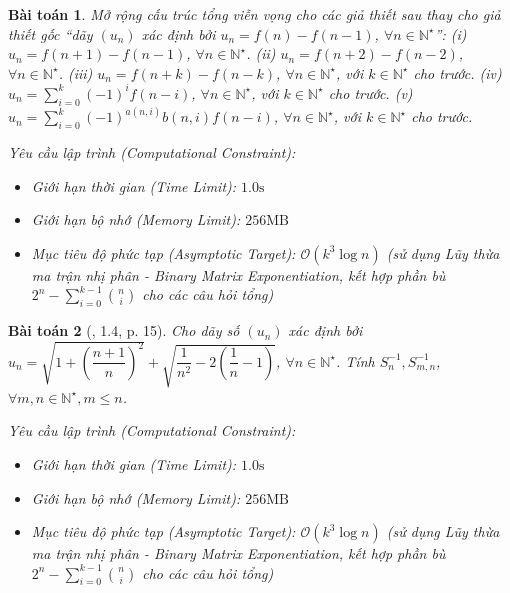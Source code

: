 \documentclass{article}
\newtheorem{baitoan}{Bài toán}
\begin{document}
\begin{baitoan}
	Mở rộng cấu trúc tổng viễn vọng cho các giả thiết sau thay cho giả thiết gốc ``dãy $(u_n)$ xác định bởi $u_n = f(n) - f(n - 1)$, $\forall n\in\mathbb{N}^\star$'': (i) $u_n = f(n+1) - f(n-1)$, $\forall n\in\mathbb{N}^\star$. (ii) $u_n = f(n+2) - f(n-2)$, $\forall n\in\mathbb{N}^\star$. (iii) $u_n = f(n+k) - f(n-k)$, $\forall n\in\mathbb{N}^\star$, với $k\in\mathbb{N}^\star$ cho trước. (iv) $u_n = \sum_{i=0}^k (-1)^i f(n-i)$, $\forall n\in\mathbb{N}^\star$, với $k\in\mathbb{N}^\star$ cho trước. (v) $u_n = \sum_{i=0}^k (-1)^{a(n,i)}b(n,i)f(n-i)$, $\forall n\in\mathbb{N}^\star$, với $k\in\mathbb{N}^\star$ cho trước.

    \vspace{0.5em}
    \emph{Yêu cầu lập trình (Computational Constraint):}
    \begin{itemize}
        \item Giới hạn thời gian (Time Limit): $1.0\mathrm{s}$
        \item Giới hạn bộ nhớ (Memory Limit): $256\mathrm{MB}$
        \item Mục tiêu độ phức tạp (Asymptotic Target): $\mathcal{O}(k^3 \log n)$ (sử dụng Lũy thừa ma trận nhị phân - Binary Matrix Exponentiation, kết hợp phần bù $2^n - \sum_{i=0}^{k-1} \binom{n}{i}$ cho các câu hỏi tổng)
    \end{itemize}
\end{baitoan}


\begin{baitoan}[\cite{Quoc_Long_Dat_Nam_VMC}, 1.4, p. 15]
	Cho dãy số $(u_n)$ xác định bởi $u_n = \sqrt{1 + \left(\dfrac{n + 1}{n}\right)^2} + \sqrt{\dfrac{1}{n^2} - 2\left(\dfrac{1}{n} - 1\right)}$, $\forall n\in\mathbb{N}^\star$. Tính $S_n^{-1},S_{m,n}^{-1}$, $\forall m,n\in\mathbb{N}^\star,m\le n$.

    \vspace{0.5em}
    \emph{Yêu cầu lập trình (Computational Constraint):}
    \begin{itemize}
        \item Giới hạn thời gian (Time Limit): $1.0\mathrm{s}$
        \item Giới hạn bộ nhớ (Memory Limit): $256\mathrm{MB}$
        \item Mục tiêu độ phức tạp (Asymptotic Target): $\mathcal{O}(k^3 \log n)$ (sử dụng Lũy thừa ma trận nhị phân - Binary Matrix Exponentiation, kết hợp phần bù $2^n - \sum_{i=0}^{k-1} \binom{n}{i}$ cho các câu hỏi tổng)
    \end{itemize}
\end{baitoan}
\end{document}
